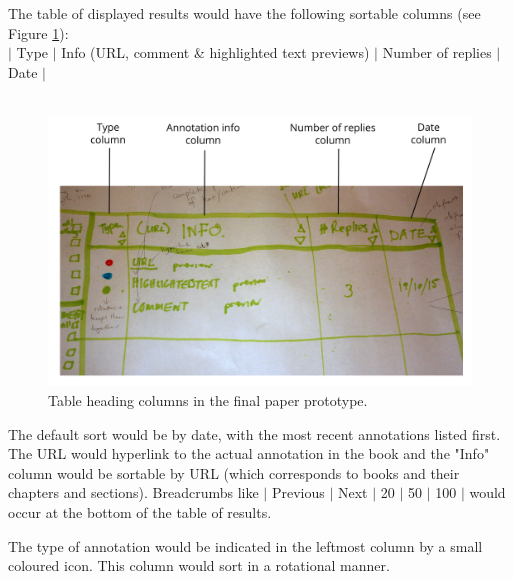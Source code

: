 The table of displayed results would have the following sortable columns (see Figure \ref{fig:TableHead}): \\
$\vert$ Type $\vert$ Info (URL, comment \& highlighted text previews) $\vert$ Number of replies $\vert$ Date $\vert$\\
\\
\begin{figure}[h!]
    \centering
    \includegraphics[width=\textwidth]{Figures/PDColumnHeadingLabels.png}
 \caption{Table heading columns in the final paper prototype.}
 \label{fig:TableHead}
\end{figure}
The default sort would be by date, with the most recent annotations listed first. The URL would hyperlink to the actual annotation in the book and the "Info" column would be sortable by URL (which corresponds to books and their chapters and sections). Breadcrumbs like $\vert$ Previous $\vert$ Next $\vert$ 20 $\vert$ 50 $\vert$ 100 $\vert$ would occur at the bottom of the table of results. 

The type of annotation would be indicated in the leftmost column by a small coloured icon. This column would sort in a rotational manner. 

